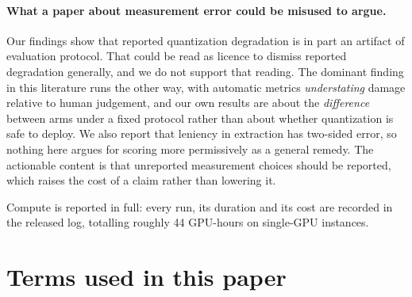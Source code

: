 \documentclass[conference]{IEEEtran}
\begin{document}
\paragraph{What a paper about measurement error could be misused to argue.}
Our findings show that reported quantization degradation is in part an artifact
of evaluation protocol. That could be read as licence to dismiss reported
degradation generally, and we do not support that reading. The dominant finding
in this literature runs the other way, with automatic metrics \emph{understating}
damage relative to human judgement, and our own results are about the
\emph{difference} between arms under a fixed protocol rather than about whether
quantization is safe to deploy. We also report that leniency in extraction has
two-sided error, so nothing here argues for scoring more permissively as a
general remedy. The actionable content is that unreported measurement choices
should be reported, which raises the cost of a claim rather than lowering it.

Compute is reported in full: every run, its duration and its cost are recorded
in the released log, totalling roughly 44 GPU-hours on single-GPU instances.





\appendices

\section{Terms used in this paper}
\label{app:glossary}

%
%
\end{document}
